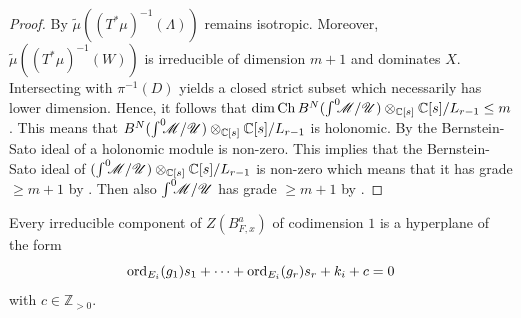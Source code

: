 \begin{proof}
  By \cite[Proposition 4.9]{kashiwara1976b} $\widetilde{\mu}((T^*\mu)^{-1}(\Lambda))$ remains isotropic.
  Moreover, $\widetilde{\mu}((T^*\mu)^{-1}(W))$ is irreducible of dimension $m+1$ and dominates $X$.
  Intersecting with $\pi^{-1}(D)$ yields a closed strict subset which necessarily has lower dimension.
  Hence, it follows that $\dim \operatorname{Ch} B^N (\int^0 \mkern -8mu\mathscr{M}/\allowbreak \mathscr{U})\otimes_{\mathbb{C}[s]}\mathbb{C}[s]/L_{r-1} \leq m$.
  This means that $B^N(\int^0 \mkern -8mu\mathscr{M}/ \mathscr{U})\otimes_{\mathbb{C}[s]}\mathbb{C}[s]/L_{r-1}$ is holonomic.
  By \cite[Proposition 3.11, Chapter 3]{bjork1979rings} the Bernstein-Sato ideal of a holonomic module is non-zero.
  This implies that the Bernstein-Sato ideal of $(\int^0 \mkern -8mu\mathscr{M}/ \mathscr{U})\otimes_{\mathbb{C}[s]}\mathbb{C}[s]/L_{r-1}$ is non-zero which means that it has grade $\geq m+1$ by .
  Then also $\int^0 \mkern -8mu\mathscr{M}/\mathscr{U}$ has grade $\geq m+1$ by .
  \end{proof}
  \begin{theorem}\label{thm: EstimateBernsteinSatoZeroLocust}
  Every irreducible component of $Z(B_{F,x}^a)$ of codimension $1$ is a hyperplane of the form
  $$\operatorname{ord}_{E_i}(g_1) s_1 + \cdots + \operatorname{ord}_{E_i}(g_r)s_r + k_i + c=0$$
  with $c \in \mathbb{Z}_{> 0 }$.
\end{theorem}
